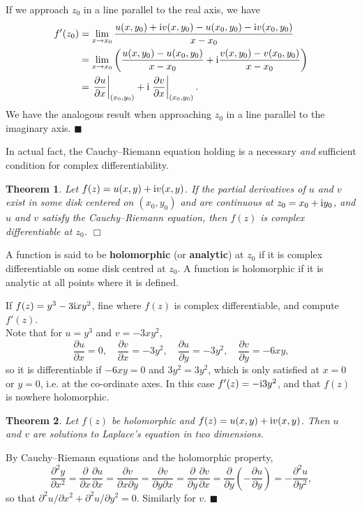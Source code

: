 \documentclass[letter-paper]{tufte-book}
\newtheorem{theorem}{\color{pastel-blue}Theorem}[section]
\newenvironment{proof}[1][Proof]{\begin{trivlist}
\item[\hskip \labelsep {\bfseries #1}]}{\end{trivlist}}
\newenvironment{example}[1][Example]{\begin{trivlist}
\item[\hskip \labelsep {\bfseries #1}]}{\end{trivlist}}
\newcommand{\dy}{\partial}
\newcommand{\ddy}[2]{\frac{\dy#1}{\dy#2}}
\newcommand{\zi}{{\rm i}}
\newcommand\Def[1]{\textbf{#1}}
\newcommand{\qed}{\hfill$\blacksquare$}
\newcommand{\qedwhite}{\hfill \ensuremath{\Box}}
\begin{document}
\begin{proof}
  If we approach $z_0$ in a line parallel to the real axis, we have
  \begin{align*}
    f'(z_0) 
      &= \lim_{x \to x_0} \frac{u(x, y_0) + \zi v(x, y_0) - u(x_0, y_0) - \zi v(x_0, y_0)}{x - x_0}\\
      &= \lim_{x \to x_0} \left(\frac{u(x, y_0) - u(x_0, y_0)}{x - x_0} + \zi \frac{v(x, y_0) - v(x_0, y_0)}{x - x_0}\right)\\
      &= \left.\ddy{u}{x}\right|_{(x_0, y_0)} + \zi \left.\ddy{v}{x}\right|_{(x_0, y_0)}.
  \end{align*}
  We have the analogous result when approaching $z_0$ in a line parallel to the
  imaginary axis. \qed
\end{proof}

In actual fact, the Cauchy--Riemann equation holding is a necessary \emph{and}
sufficient condition for complex differentiability.

\begin{theorem}
  Let $f(z) = u(x,y) + \zi v(x,y)$. If the partial derivatives of $u$ and $v$
  exist in some disk centered on $(x_0, y_0)$ and are continuous at $z_0 = x_0 +
  \zi y_0$, and $u$ and $v$ satisfy the Cauchy--Riemann equation, then $f(z)$ is
  complex differentiable at $z_0$. \qedwhite
\end{theorem}

A function is said to be \Def{holomorphic} (or \Def{analytic}) at $z_0$ if it is
complex differentiable on some disk centred at $z_0$. A function is holomorphic
if it is analytic at all points where it is defined.

\begin{example}
  If $f(z) = y^3 - 3\zi x y^2$, fine where $f(z)$ is complex differentiable, and
  compute $f'(z)$.\\
  
  Note that for $u = y^3$ and $v = -3xy^2$,
  \begin{equation*}
    \ddy{u}{x} = 0, \quad \ddy{v}{x} = -3y^2, \quad \ddy{u}{y} = -3y^2, \quad \ddy{v}{y} = -6xy,
  \end{equation*}
  so it is differentiable if $-6xy = 0$ and $3y^2 = 3y^2$, which is only
  satisfied at $x=0$ or $y=0$, i.e. at the co-ordinate axes. In this case $f'(z)
  = -\zi 3y^2$, and that $f(z)$ is nowhere holomorphic.
\end{example}

\begin{theorem}
  Let $f(z)$ be holomorphic and $f(z) = u(x,y) + \zi v(x,y)$. Then $u$ and $v$
  are solutions to Laplace's equation in two dimensions.
\end{theorem}
\begin{proof}
  By Cauchy--Riemann equations and the holomorphic property,
  \begin{equation*}
    \ddy{^2 y}{x^2} = \ddy{}{x}\ddy{u}{x} = \ddy{v}{x\partial y} = \ddy{v}{y\partial x} = \ddy{}{y}\ddy{v}{x} = \ddy{}{y}\left(-\ddy{u}{y}\right) = -\ddy{^2 u}{y^2},
  \end{equation*}
  so that $\partial^2 u / \partial x^2 + \partial^2 u / \partial y^2 = 0$.
  Similarly for $v$. \qed
\end{proof}
\end{document}
